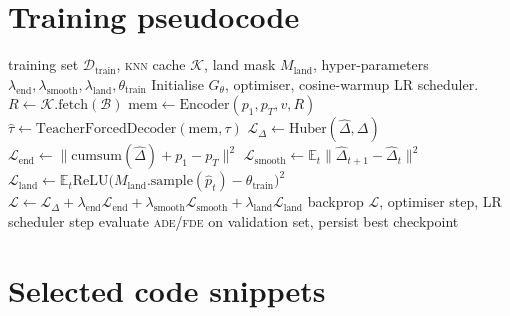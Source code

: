 \documentclass[11pt,a4paper]{article}
\newcommand{\ade}{\textsc{ade}}
\newcommand{\fde}{\textsc{fde}}
\newcommand{\knn}{\textsc{knn}}
\newcommand{\code}[1]{\texttt{\small #1}}
\begin{document}
\appendix
\section{Training pseudocode}\label{app:train}

\begin{algorithm}[H]
\caption{Training loop for \code{TrajectoryGeneratorV10}.}
\label{alg:train}
\begin{algorithmic}[1]
\REQUIRE training set $\mathcal{D}_{\mathrm{train}}$,
         \knn{} cache $\mathcal{K}$,
         land mask $M_{\mathrm{land}}$,
         hyper-parameters
         $\lambda_{\mathrm{end}},\lambda_{\mathrm{smooth}},
          \lambda_{\mathrm{land}},\theta_{\mathrm{train}}$
\STATE Initialise $G_\theta$, optimiser, cosine-warmup LR scheduler.
    \STATE $R \leftarrow \mathcal{K}.\text{fetch}(\mathcal{B})$
    \STATE $\mathrm{mem} \leftarrow
            \text{Encoder}(p_1, p_T, v, R)$
    \STATE $\hat\tau \leftarrow
            \text{TeacherForcedDecoder}(\mathrm{mem}, \tau)$
    \STATE $\mathcal{L}_\Delta \leftarrow
            \text{Huber}(\hat\Delta, \Delta)$
    \STATE $\mathcal{L}_{\mathrm{end}} \leftarrow
            \| \mathrm{cumsum}(\hat\Delta) + p_1 - p_T \|^2$
    \STATE $\mathcal{L}_{\mathrm{smooth}} \leftarrow
            \mathbb{E}_t \|\hat\Delta_{t+1} - \hat\Delta_t\|^2$
    \STATE $\mathcal{L}_{\mathrm{land}} \leftarrow
            \mathbb{E}_t \mathrm{ReLU}\bigl(M_{\mathrm{land}}.\text{sample}(\hat p_t)
                                    - \theta_{\mathrm{train}}\bigr)^2$
    \STATE $\mathcal{L} \leftarrow
            \mathcal{L}_\Delta
            + \lambda_{\mathrm{end}}\mathcal{L}_{\mathrm{end}}
            + \lambda_{\mathrm{smooth}}\mathcal{L}_{\mathrm{smooth}}
            + \lambda_{\mathrm{land}}\mathcal{L}_{\mathrm{land}}$
    \STATE backprop $\mathcal{L}$, optimiser step, LR scheduler step
  \ENDFOR
  \STATE evaluate \ade/\fde{} on validation set, persist best checkpoint
\ENDFOR
\end{algorithmic}
\end{algorithm}

\section{Selected code snippets}\label{app:code}
\end{document}
